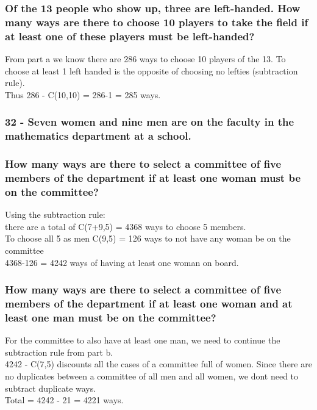 \documentclass{article}
\begin{document}
\subsubsection[28c]{Of the 13 people who show up, three are left-handed. How many ways are there to choose 10 players to take the field if at least one of these players must be left-handed?}
From part a we know there are 286 ways to choose 10 players of the 13. To choose at least 1 left handed is the opposite of choosing no lefties (subtraction rule).\\
Thus 286 - C(10,10) = 286-1 = 285 ways.
\subsubsection*{32 - Seven women and nine men are on the faculty in the
mathematics department at a school.}
\subsubsection[32a]{How many ways are there to select a committee of five members of the department if at least one woman must be on the committee?}
Using the subtraction rule:\\
there are a total of C(7+9,5) = 4368 ways to choose 5 members.\\
To choose all 5 as men C(9,5) = 126 ways to not have any woman be on the committee\\
4368-126 = 4242 ways of having at least one woman on board.
\subsubsection[32b]{How many ways are there to select a committee of five members of the department if at least one woman and at least one man must be on the committee?}
For the committee to also have at least one man, we need to continue the subtraction rule from part b.\\
4242 - C(7,5) discounts all the cases of a committee full of women. Since there are no duplicates between a committee of all men and all women, we dont need to subtract duplicate ways.\\
Total = 4242 - 21 = 4221 ways.
\end{document}
